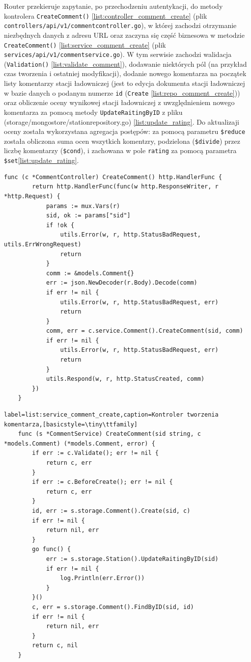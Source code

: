 Router przekieruje zapytanie, po przechodzeniu autentykacji, do metody kontrolera \texttt{CreateComment()} \ref{list:controller_comment_create} (plik \texttt{controllers/api/v1/commentcontroller.go}), w której zachodzi otrzymanie niezbędnych danych z adresu URL oraz zaczyna się część biznesowa w metodzie \texttt{CreateComment()} \ref{list:service_comment_create} (plik \texttt{services/api/v1/commentservice.go}).
W tym serwisie zachodzi walidacja (\texttt{Validation()} \ref{list:validate_comment}), dodawanie niektórych pól (na przykład czas tworzenia i ostatniej modyfikacji), dodanie nowego komentarza na początek listy komentarzy stacji ładowniczej (jest to edycja dokumenta stacji ładowniczej w bazie danych o podanym numerze \texttt{id} (\texttt{Create} \ref{list:repo_comment_create})) oraz obliczenie oceny wynikowej stacji ładowniczej z uwzględnieniem nowego komentarza za pomocą metody \texttt{UpdateRaitingByID} z pliku (storage/mongostore/stationrepository.go) \ref{list:update_rating}.
Do aktualizaji oceny została wykorzystana agregacja postępów: za pomocą parametru \texttt{\$reduce} została obliczona suma ocen wszytkich komentzry, podzielona (\texttt{\$divide}) przez liczbę komentarzy (\texttt{\$cond}), i zachowana w pole \texttt{rating} za pomocą parametra \texttt{\$set}\ref{list:update_rating}.
\begin{lstlisting}[label=list:controller_comment_create,caption=Struktura komentarza,basicstyle=\tiny\ttfamily]
    func (c *CommentController) CreateComment() http.HandlerFunc {
        return http.HandlerFunc(func(w http.ResponseWriter, r *http.Request) {
            params := mux.Vars(r)
            sid, ok := params["sid"]
            if !ok {
                utils.Error(w, r, http.StatusBadRequest, utils.ErrWrongRequest)
                return
            }
            comm := &models.Comment{}
            err := json.NewDecoder(r.Body).Decode(comm)
            if err != nil {
                utils.Error(w, r, http.StatusBadRequest, err)
                return
            }
            comm, err = c.service.Comment().CreateComment(sid, comm)
            if err != nil {
                utils.Error(w, r, http.StatusBadRequest, err)
                return
            }
            utils.Respond(w, r, http.StatusCreated, comm)
        })
    }
\end{lstlisting}
\begin{lstlisting}label=list:service_comment_create,caption=Kontroler tworzenia komentarza,[basicstyle=\tiny\ttfamily]
    func (s *CommentService) CreateComment(sid string, c *models.Comment) (*models.Comment, error) {
        if err := c.Validate(); err != nil {
            return c, err
        }
        if err := c.BeforeCreate(); err != nil {
            return c, err
        }
        id, err := s.storage.Comment().Create(sid, c)
        if err != nil {
            return nil, err
        }
        go func() {
            err := s.storage.Station().UpdateRaitingByID(sid)
            if err != nil {
                log.Println(err.Error())
            }
        }()
        c, err = s.storage.Comment().FindByID(sid, id)
        if err != nil {
            return nil, err
        }
        return c, nil
    }
\end{lstlisting}
